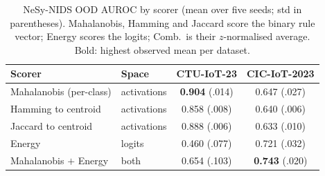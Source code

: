 \documentclass[journal]{IEEEtran}
\begin{document}
\begin{table}[t]
\centering\footnotesize
\caption{NeSy-NIDS OOD AUROC by scorer (mean over five seeds; std in parentheses). Mahalanobis, Hamming and Jaccard score the binary rule vector; Energy scores the logits; Comb.\ is their $z$-normalised average. Bold: highest observed mean per dataset.}
\label{tab:scorer}
\setlength{\tabcolsep}{3pt}
\begin{tabular}{llcc}
\toprule
Scorer & Space & CTU-IoT-23 & CIC-IoT-2023 \\
\midrule
Mahalanobis (per-class) & activations & \textbf{0.904} (.014) & 0.647 (.027) \\
Hamming to centroid     & activations & 0.858 (.008) & 0.640 (.006) \\
Jaccard to centroid     & activations & 0.888 (.006) & 0.633 (.010) \\
Energy                  & logits      & 0.460 (.077) & 0.721 (.032) \\
Mahalanobis $+$ Energy  & both        & 0.654 (.103) & \textbf{0.743} (.020) \\
\bottomrule
\end{tabular}
\end{table}
\end{document}
